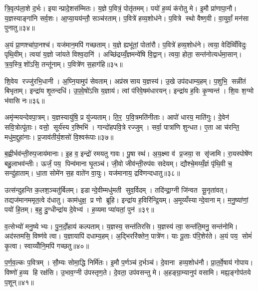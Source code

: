 त्रि॒वृत्प॑ला॒शे द॒र्भः। इयान्प्रादे॒शस॑म्मितः। य॒ज्ञे प॒वित्रं॒ पोतृ॑तमम्। पयो॑ ह॒व्यं क॑रोतु मे। इ॒मौ प्रा॑णापा॒नौ। य॒ज्ञस्याङ्गा॑नि सर्व॒शः। आ॒प्या॒यय॑न्तौ॒ सञ्च॑रताम्। प॒वित्रे॑ हव्य॒शोध॑ने। प॒वित्रे स्थो वैष्ण॒वी। वा॒युर्वां॒ मन॑सा पुनातु॥३४॥

अ॒यं प्रा॒णश्चा॑पा॒नश्च॑। यज॑मान॒मपि॑ गच्छताम्। य॒ज्ञे ह्यभू॑तां॒ पोता॑रौ। प॒वित्रे॑ हव्य॒शोध॑ने। त्वया॒ वेदि॑व्विँविदुः पृथि॒वीम्। त्वया॑ य॒ज्ञो जा॑यते विश्व॒दानि॑। अच्छि॑द्रय्यँ॒ज्ञमन्वे॑षि वि॒द्वान्। त्वया॒ होता॒ सन्त॑नोत्यर्धमा॒सान्। त्र॒य॒स्त्रि॒शो॑ऽसि॒ तन्तू॑नाम्। प॒वित्रे॑ण स॒हाग॑हि॥३५॥

शि॒वेय रज्जु॑रभि॒धानी। अ॒घ्नि॒यामुप॑ सेवताम्। अप्र॑स्रसाय य॒ज्ञस्य॑। उ॒खे उप॑दधाम्य॒हम्। प॒शुभि॒ सन्नी॑तं बिभृताम्। इन्द्रा॑य शृ॒तन्दधि॑। उ॒प॒वे॒षो॑ऽसि य॒ज्ञाय॑। त्वां प॑रिवे॒षम॑धारयन्। इन्द्रा॑य ह॒विः कृ॒ण्वन्त॑। शि॒वः श॒ग्मो भ॑वासि नः॥३६॥

अमृ॑न्मयन्देवपा॒त्रम्। य॒ज्ञस्यायु॑षि॒ प्र यु॑ज्यताम्। ति॒र॒ प॒वि॒त्रमति॑नीताः। आपो॑ धारय॒ माति॑गुः। दे॒वेन॑ सवि॒त्रोत्पू॑ताः। वसो॒ सूर्य॑स्य र॒श्मिभि॑। गान्दो॑हपवि॒त्रे रज्जुम्। सर्वा॒ पात्रा॑णि शुन्धत। ए॒ता आ च॑रन्ति॒ मधु॑म॒द्दुहा॑नाः। प्र॒जाव॑तीर्य॒शसो॑ वि॒श्वरू॑पाः॥३७॥

ब॒ह्वीर्भव॑न्ती॒रुप॒जाय॑मानाः। इ॒ह व॒ इन्द्रो॑ रमयतु गावः। पू॒षा स्थ॑। अ॒य॒क्ष्मा व॑ प्र॒जया॒ स सृ॑जामि। रा॒यस्पोषे॑ण बहु॒लाभव॑न्तीः। ऊर्जं॒ पय॒ पिन्व॑माना घृ॒तञ्च॑। जी॒वो जीव॑न्ती॒रुप॑वः सदेयम्। द्यौश्चे॒मय्यँ॒ज्ञं पृ॑थि॒वी च॒ सन्दु॑हाताम्। धा॒ता सोमे॑न स॒ह वाते॑न वा॒युः। यज॑मानाय॒ द्रवि॑णन्दधातु॥३८॥

उत्स॑न्दुहन्ति क॒लश॒ञ्चतु॑र्बिलम्। इडान्दे॒वीम्मधु॑मती सुव॒र्विदम्। तदि॑न्द्रा॒ग्नी जि॑न्वत सू॒नृता॑वत्। तद्यज॑मानममृत॒त्वे द॑धातु। काम॑धुक्ष॒ प्र णो ब्रूहि। इन्द्रा॑य ह॒विरि॑न्द्रि॒यम्। अ॒मूय्यँस्यान्दे॒वानाम्। म॒नु॒ष्या॑णां॒ पयो॑ हि॒तम्। ब॒हु दु॒ग्धीन्द्रा॑य दे॒वेभ्य॑। ह॒व्यमा प्या॑यतां॒ पुन॑॥३९॥

व॒त्सेभ्यो॑ मनु॒ष्येभ्यः। पु॒न॒र्दो॒हाय॑ कल्पताम्। य॒ज्ञस्य॒ सन्त॑तिरसि। य॒ज्ञस्य॑ त्वा॒ सन्त॑ति॒मनु॒ सन्त॑नोमि। अद॑स्तमसि॒ विष्ण॑वे त्वा। य॒ज्ञायापि॑ दधाम्य॒हम्। अ॒द्भिररि॑क्तेन॒ पात्रे॑ण। याः पू॒ताः प॑रि॒शेर॑ते। अ॒यं पय॒ सोमं॑ कृ॒त्वा। स्वाय्योँनि॒मपि॑ गच्छतु॥४०॥

प॒र्ण॒व॒ल्कः प॒वित्रम्। सौ॒म्यः सोमा॒द्धि निर्मि॑तः। इ॒मौ प॒र्णञ्च॑ द॒र्भञ्च॑। दे॒वाना हव्य॒शोध॑नौ। प्रा॒त॒र्वे॒षाय॑ गोपाय। विष्णो॑ ह॒व्य हि रक्ष॑सि। उ॒भाव॒ग्नी उ॑पस्तृण॒ते। दे॒वता॒ उप॑वसन्तु मे। अ॒हङ्ग्रा॒म्यानुप॑ वसामि। मह्य॒ङ्गोप॑तये प॒शून्॥४१॥\anuvakamend[आभृ॑त इ॒मङ्गृ॑ह्णामि॒ पूर्व॒स्ताः पूर्व॒ परि॑गृह्णामि सभापा॒ला इन्द्र॑ज्येष्ठेभ्य॒ आदि॑त्य व्रतपते सुस॒म्भृता॑ मे स॒ह पु॑नातु गहि नो वि॒श्वरू॑पा दधातु॒ पुन॑र्गच्छतु प॒शून् (याः पु॒रस्ता॑दि॒मामूर्ज॑मि॒ह प्र॒जा इ॒ह प॒शवो॒ऽयं पि॑तृ॒णाम॒ग्निः। )]

